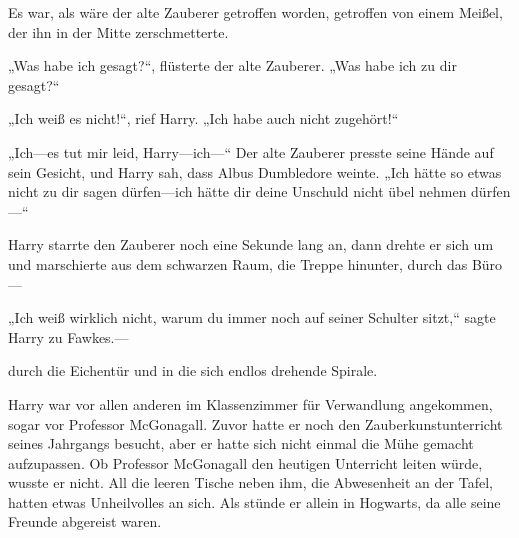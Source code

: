 Es war, als wäre der alte Zauberer getroffen worden, getroffen von einem Meißel, der ihn in der Mitte zerschmetterte.

„Was habe ich gesagt?“, flüsterte der alte Zauberer. „Was habe ich zu dir gesagt?“

„Ich weiß es nicht!“, rief Harry. „Ich habe auch nicht zugehört!“

„Ich—es tut mir leid, Harry—ich—“
Der alte Zauberer presste seine Hände auf sein Gesicht, und Harry sah, dass Albus Dumbledore weinte.
„Ich hätte so etwas nicht zu dir sagen dürfen—ich hätte dir deine Unschuld nicht übel nehmen dürfen—“

Harry starrte den Zauberer noch eine Sekunde lang an, dann drehte er sich um und marschierte aus dem schwarzen Raum, die Treppe hinunter, durch das Büro—

„Ich weiß wirklich nicht, warum du immer noch auf seiner Schulter sitzt,“ sagte Harry zu Fawkes.—

durch die Eichentür und in die sich endlos drehende Spirale.

\later

Harry war vor allen anderen im Klassenzimmer für Verwandlung angekommen, sogar vor Professor McGonagall. Zuvor hatte er noch den Zauberkunstunterricht seines Jahrgangs besucht, aber er hatte sich nicht einmal die Mühe gemacht aufzupassen. Ob Professor McGonagall den heutigen Unterricht leiten würde, wusste er nicht.
All die leeren Tische neben ihm, die Abwesenheit an der Tafel, hatten etwas Unheilvolles an sich. Als stünde er allein in Hogwarts, da alle seine Freunde abgereist waren.


